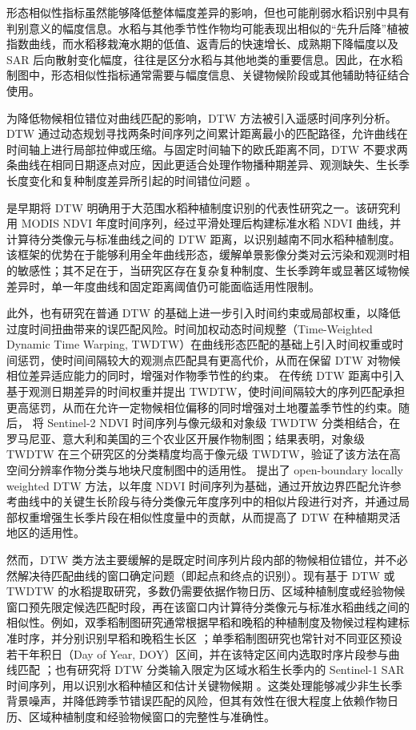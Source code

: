 形态相似性指标虽然能够降低整体幅度差异的影响，但也可能削弱水稻识别中具有判别意义的幅度信息。水稻与其他季节性作物均可能表现出相似的“先升后降”植被指数曲线，而水稻移栽淹水期的低值、返青后的快速增长、成熟期下降幅度以及 SAR 后向散射变化幅度，往往是区分水稻与其他地类的重要信息。因此，在水稻制图中，形态相似性指标通常需要与幅度信息、关键物候阶段或其他辅助特征结合使用。

为降低物候相位错位对曲线匹配的影响，DTW 方法被引入遥感时间序列分析。DTW 通过动态规划寻找两条时间序列之间累计距离最小的匹配路径，允许曲线在时间轴上进行局部拉伸或压缩。与固定时间轴下的欧氏距离不同，DTW 不要求两条曲线在相同日期逐点对应，因此更适合处理作物播种期差异、观测缺失、生长季长度变化和复种制度差异所引起的时间错位问题 \citep{Petitjean2012}。

\citet{Guan2016RemoteSensing} 是早期将 DTW 明确用于大范围水稻种植制度识别的代表性研究之一。该研究利用 MODIS NDVI 年度时间序列，经过平滑处理后构建标准水稻 NDVI 曲线，并计算待分类像元与标准曲线之间的 DTW 距离，以识别越南不同水稻种植制度。该框架的优势在于能够利用全年曲线形态，缓解单景影像分类对云污染和观测时相的敏感性；其不足在于，当研究区存在复杂复种制度、生长季跨年或显著区域物候差异时，单一年度曲线和固定距离阈值仍可能面临适用性限制。

此外，也有研究在普通 DTW 的基础上进一步引入时间约束或局部权重，以降低过度时间扭曲带来的误匹配风险。时间加权动态时间规整（Time-Weighted Dynamic Time Warping, TWDTW）在曲线形态匹配的基础上引入时间权重或时间惩罚，使时间间隔较大的观测点匹配具有更高代价，从而在保留 DTW 对物候相位差异适应能力的同时，增强对作物季节性的约束。
\citet{Maus2016} 在传统 DTW 距离中引入基于观测日期差异的时间权重并提出 TWDTW，使时间间隔较大的序列匹配承担更高惩罚，从而在允许一定物候相位偏移的同时增强对土地覆盖季节性的约束。随后，\citet{Belgiu2018} 将 Sentinel-2 NDVI 时间序列与像元级和对象级 TWDTW 分类相结合，在罗马尼亚、意大利和美国的三个农业区开展作物制图；结果表明，对象级 TWDTW 在三个研究区的分类精度均高于像元级 TWDTW，验证了该方法在高空间分辨率作物分类与地块尺度制图中的适用性。
\citet{Guan2018OLWDTW} 提出了 open-boundary locally weighted DTW 方法，以年度 NDVI 时间序列为基础，通过开放边界匹配允许参考曲线中的关键生长阶段与待分类像元年度序列中的相似片段进行对齐，并通过局部权重增强生长季片段在相似性度量中的贡献，从而提高了 DTW 在种植期灵活地区的适用性。

然而，DTW 类方法主要缓解的是既定时间序列片段内部的物候相位错位，并不必然解决待匹配曲线的窗口确定问题（即起点和终点的识别）。现有基于 DTW 或 TWDTW 的水稻提取研究，多数仍需要依据作物日历、区域种植制度或经验物候窗口预先限定候选匹配时段，再在该窗口内计算待分类像元与标准水稻曲线之间的相似性。例如，双季稻制图研究通常根据早稻和晚稻的种植制度及物候过程构建标准时序，并分别识别早稻和晚稻生长区 \citep{Pan2021RemoteSensing}；单季稻制图研究也常针对不同亚区预设若干年积日（Day of Year, DOY）区间，并在该特定区间内选取时序片段参与曲线匹配 \citep{Shen2023ESSD}；也有研究将 DTW 分类输入限定为区域水稻生长季内的 Sentinel-1 SAR 时间序列，用以识别水稻种植区和估计关键物候期 \citep{Wang2022OpenGeosciences}。这类处理能够减少非生长季背景噪声，并降低跨季节错误匹配的风险，但其有效性在很大程度上依赖作物日历、区域种植制度和经验物候窗口的完整性与准确性。

